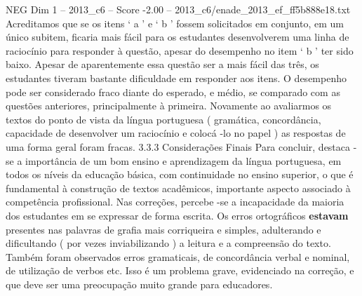 \begin{textsample}{NEG Dim 1 – 2013\_c6 – Score -2.00 – 2013\_c6/enade\_2013\_ef\_ff5b888e18.txt}
Acreditamos que se os itens ‘ a ’ e ‘ b ’ fossem solicitados em conjunto, em um único subitem, ficaria mais fácil para os estudantes desenvolverem uma linha de raciocínio para responder à questão, apesar do desempenho no item ‘ b ’ ter sido baixo.
Apesar de aparentemente essa questão ser a mais fácil das três, os estudantes tiveram bastante dificuldade em responder aos itens.
O desempenho pode ser considerado fraco diante do esperado, e médio, se comparado com as questões anteriores, principalmente à primeira.
Novamente ao avaliarmos os textos do ponto de vista da língua portuguesa ( gramática, concordância, capacidade de desenvolver um raciocínio e colocá -lo no papel ) as respostas de uma forma geral foram fracas. 3.3.3 Considerações Finais Para concluir, destaca -se a importância de um bom ensino e aprendizagem da língua portuguesa, em todos os níveis da educação básica, com continuidade no ensino superior, o que é fundamental à construção de textos acadêmicos, importante aspecto associado à competência profissional.
Nas correções, percebe -se a incapacidade da maioria dos estudantes em se expressar de forma escrita.
Os erros ortográficos \textbf{estavam} presentes nas palavras de grafia mais corriqueira e simples, adulterando e dificultando ( por vezes inviabilizando ) a leitura e a compreensão do texto.
Também foram observados erros gramaticais, de concordância verbal e nominal, de utilização de verbos etc.
Isso é um problema grave, evidenciado na correção, e que deve ser uma preocupação muito grande para educadores.

\end{textsample}
